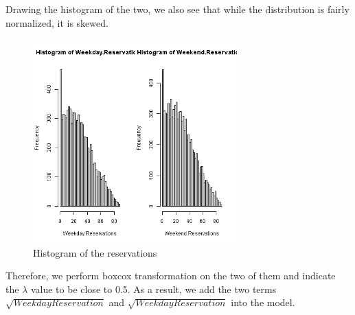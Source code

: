 Drawing the histogram of the two, we also see that while the distribution is fairly normalized, it is skewed. 
\begin{figure}[H]
\centering
\includegraphics[width=0.7\textwidth]{img/scatterthis.png}
\caption{Histogram of the reservations}
\label{fig:scaled_hist_distribution_reservation}
\end{figure}
Therefore, we perform boxcox transformation on the two of them and indicate the $\lambda$ value to be close to 0.5. As a result, we add the two terms $\sqrt{WeekdayReservation}$ and $\sqrt{WeekdayReservation}$ into the model.

